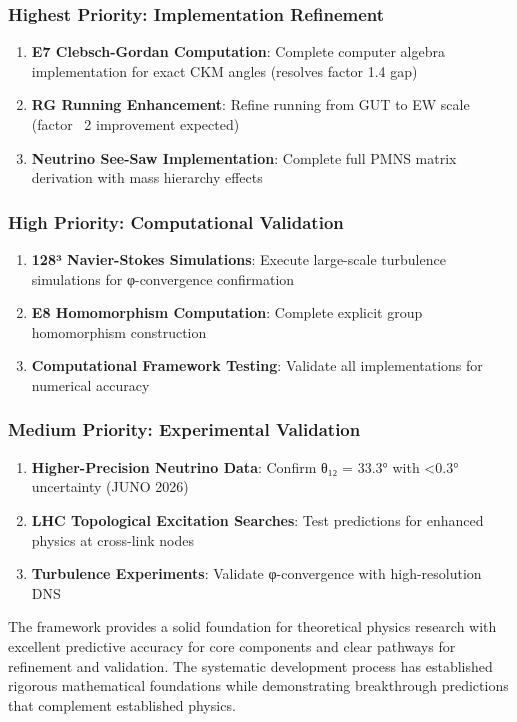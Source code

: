 \documentclass[12pt,a4paper]{article}
\begin{document}
\begin{itemize}
\begin{itemize}
\subsubsection{Highest Priority: Implementation Refinement}
\begin{enumerate}
\item \textbf{E7 Clebsch-Gordan Computation}: Complete computer algebra implementation for exact CKM angles (resolves factor 1.4 gap)
\item \textbf{RG Running Enhancement}: Refine running from GUT to EW scale (factor ~2 improvement expected)
\item \textbf{Neutrino See-Saw Implementation}: Complete full PMNS matrix derivation with mass hierarchy effects
\end{enumerate}

\subsubsection{High Priority: Computational Validation}
\begin{enumerate}
\item \textbf{128³ Navier-Stokes Simulations}: Execute large-scale turbulence simulations for φ-convergence confirmation
\item \textbf{E8 Homomorphism Computation}: Complete explicit group homomorphism construction
\item \textbf{Computational Framework Testing}: Validate all implementations for numerical accuracy
\end{enumerate}

\subsubsection{Medium Priority: Experimental Validation}
\begin{enumerate}
\item \textbf{Higher-Precision Neutrino Data}: Confirm θ₁₂ = 33.3° with <0.3° uncertainty (JUNO 2026)
\item \textbf{LHC Topological Excitation Searches}: Test predictions for enhanced physics at cross-link nodes
\item \textbf{Turbulence Experiments}: Validate φ-convergence with high-resolution DNS
\end{enumerate}

The framework provides a solid foundation for theoretical physics research with excellent predictive accuracy for core components and clear pathways for refinement and validation. The systematic development process has established rigorous mathematical foundations while demonstrating breakthrough predictions that complement established physics.


\end{itemize}
\end{itemize}
\end{document}
